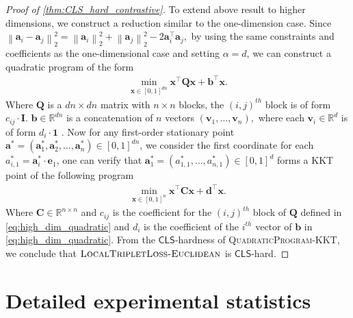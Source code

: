 \documentclass{article}
\theoremstyle{definition}  %
\theoremstyle{plain}
\numberwithin{observation}{section}
\numberwithin{claim}{section}
\numberwithin{fact}{section}
\numberwithin{lemma}{section}
\numberwithin{proposition}{section}
\numberwithin{theorem}{section}
\numberwithin{corollary}{section}
\numberwithin{definition}{section}
\def\va{{\bm{a}}}
\def\vb{{\bm{b}}}
\def\vd{{\bm{d}}}
\def\ve{{\bm{e}}}
\def\vv{{\bm{v}}}
\def\vx{{\bm{x}}}
\newcommand{\norm}[1]{\left\| #1 \right\|}
\newcommand{\mat}[1]{\mathbf{#1}}
\newcommand{\CLS}{\mathsf{CLS}}
\newcommand{\Contrastive}{\textsc{LocalTripletLoss-Euclidean}}
\theoremstyle{plain}
\begin{document}
\begin{proof}[Proof of \cref{thm:CLS_hard_contrastive}]
    To extend above result to higher dimensions, we construct a reduction similar to the one-dimension case. Since $\norm{\va_{i} - \va_{j}}_2^2 = \norm{\va_i}_2^2 + \norm{\va_j}_2^2 - 2 \va_i^\top \va_j,$ by using the same constraints and coefficients as the one-dimensional case and setting $\alpha = d$, we can construct a quadratic program of the form
    \begin{align}
        \min_{\vx \in [0, 1]^{dn}} \vx^\top \mat{Q} \vx + \vb^\top \vx. \label{eq:high_dim_quadratic}
    \end{align}
    Where $\mat{Q}$ is a $dn \times dn$ matrix with $n \times n$ blocks, the $(i, j)^{th}$ block is of form $c_{ij} \cdot \mat{I}$. $\vb \in \mathbb{R}^{dn}$ is a concatenation of $n$ vectors $(\vv_1, \dots, \vv_n),$ where each $\vv_i \in \mathbb{R}^d$ is of form $d_i \cdot \bm{1}$ . Now for any first-order stationary point $\va^* = (\va_1^*, \va_2^*, \dots, \va_n^*)\in [0, 1]^{dn}$, we consider the first coordinate for each $a_{i, 1}^* = \va_i^* \cdot \ve_1$, one can verify that $\va_1^* = (a^*_{1, 1}, \dots, a^*_{n, 1}) \in [0, 1]^d$ forms a KKT point of the following program
    \begin{align*}
        \min_{\vx \in [0, 1]^n} \vx^\top \mat{C} \vx + \vd^\top \vx.
    \end{align*}
    Where $\mat{C} \in \mathbb{R}^{n \times n}$ and $c_{ij}$ is the coefficient for the $(i, j)^{th}$ block of $\mat{Q}$ defined in \eqref{eq:high_dim_quadratic} and $d_i$ is the coefficient of the $i^{th}$ vector of $\vb$ in \eqref{eq:high_dim_quadratic}. From the $\CLS$-hardness of \textsc{QuadraticProgram-KKT}, we conclude that $\Contrastive$ is $\CLS$-hard.
\end{proof}


\section{Detailed experimental statistics}\label{app:experiment-table}


\end{document}
